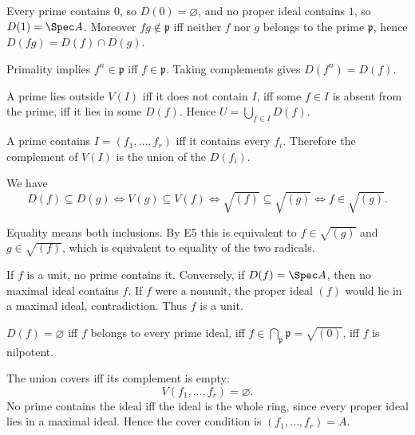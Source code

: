 \begin{solution}[VI.08.E1]
Every prime contains $0$, so $D(0)=\varnothing$, and no proper ideal contains $1$, so $D(1)=\Spec A$.
Moreover $fg\notin\mathfrak p$ iff neither $f$ nor $g$ belongs to the prime $\mathfrak p$, hence
$D(fg)=D(f)\cap D(g)$.
\end{solution}

\begin{solution}[VI.08.E2]
Primality implies $f^n\in\mathfrak p$ iff $f\in\mathfrak p$.  Taking complements gives $D(f^n)=D(f)$.
\end{solution}

\begin{solution}[VI.08.E3]
A prime lies outside $V(I)$ iff it does not contain $I$, iff some $f\in I$ is absent from the prime,
iff it lies in some $D(f)$.  Hence $U=\bigcup_{f\in I}D(f)$.
\end{solution}

\begin{solution}[VI.08.E4]
A prime contains $I=(f_1,\dots,f_r)$ iff it contains every $f_i$.  Therefore the complement of
$V(I)$ is the union of the $D(f_i)$.
\end{solution}

\begin{solution}[VI.08.E5]
We have
\[
D(f)\subseteq D(g)\iff V(g)\subseteq V(f)
\iff \sqrt{(f)}\subseteq\sqrt{(g)}
\iff f\in\sqrt{(g)}.
\]
\end{solution}

\begin{solution}[VI.08.E6]
Equality means both inclusions.  By E5 this is equivalent to
$f\in\sqrt{(g)}$ and $g\in\sqrt{(f)}$, which is equivalent to equality of the two radicals.
\end{solution}

\begin{solution}[VI.08.E7]
If $f$ is a unit, no prime contains it.  Conversely, if $D(f)=\Spec A$, then no maximal ideal
contains $f$.  If $f$ were a nonunit, the proper ideal $(f)$ would lie in a maximal ideal, contradiction.
Thus $f$ is a unit.
\end{solution}

\begin{solution}[VI.08.E8]
$D(f)=\varnothing$ iff $f$ belongs to every prime ideal, iff
$f\in\bigcap_{\mathfrak p}\mathfrak p=\sqrt{(0)}$, iff $f$ is nilpotent.
\end{solution}

\begin{solution}[VI.08.E9]
The union covers iff its complement is empty:
\[
V(f_1,\dots,f_r)=\varnothing.
\]
No prime contains the ideal iff the ideal is the whole ring, since every proper ideal lies in a maximal ideal.
Hence the cover condition is $(f_1,\dots,f_r)=A$.
\end{solution}

